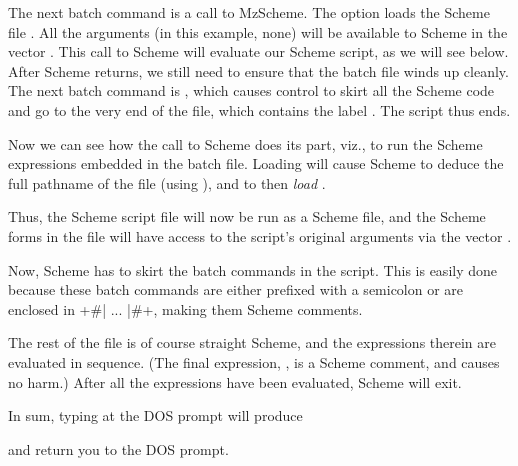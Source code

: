 The next batch command is a call to MzScheme.  The
 option loads the Scheme file .
All the arguments (in this example, none) will be
available to Scheme in the vector .  This call
to Scheme will evaluate our Scheme script, as we will
see below.  After Scheme returns, we still need to
ensure that the batch file winds up cleanly.  The next
batch command is , which causes
control to skirt all the Scheme code and go to the very
end of the file, which contains the label
.   The script thus ends.

Now we can see how the call to Scheme does its part,
viz., to run the Scheme expressions embedded in the
batch file.  Loading  will cause Scheme
to deduce the full pathname of the file 
(using ), and to then {\em
load}
.  

Thus, the Scheme script file will now be run as a
Scheme file, and the Scheme forms in the file will have
access to the script’s original arguments via the
vector .

Now, Scheme has to skirt the batch commands in the
script.  This is easily done because these batch
commands are either prefixed with a semicolon or are
enclosed in \p+#| ... |#+, making them Scheme comments.

The rest of the file is of course straight Scheme, and
the expressions therein are evaluated in sequence.  (The
final expression, , is a Scheme comment, and
causes no harm.)  After all the expressions have been
evaluated, Scheme will exit.

In sum, typing  at the DOS prompt will produce


\n and return you to the DOS prompt.
